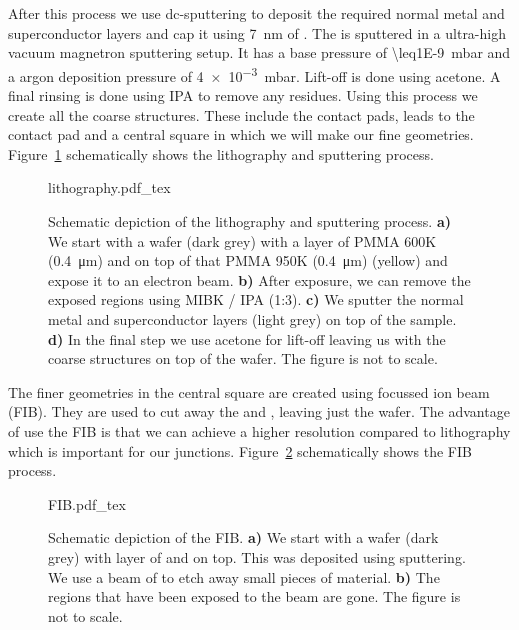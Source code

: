 After this process we use dc-sputtering to deposit the required normal metal and superconductor layers and cap it using \qty{7}{\nano\meter} of . The  is sputtered in a ultra-high vacuum magnetron sputtering setup. It has a base pressure of \qty{\leq1E-9}{\milli\bar} and a argon deposition pressure of \qty{4e-3}{\milli\bar}. Lift-off is done using acetone. A final rinsing is done using IPA to remove any residues. Using this process we create all the coarse structures. These include the contact pads, leads to the contact pad and a central square in which we will make our fine geometries. Figure~\ref{fig:lithography} schematically shows the lithography and sputtering process.

\begin{figure}[ht!]
	\centering
	\def\svgwidth{\textwidth}
	{lithography.pdf_tex}
	\caption{Schematic depiction of the lithography and sputtering process. \textbf{a)} We start with a  wafer (dark grey) with a layer of PMMA 600K (\qty{0.4}{\micro\meter}) and on top of that PMMA 950K (\qty{0.4}{\micro\meter}) (yellow) and expose it to an electron beam. \textbf{b)} After exposure, we can remove the exposed regions using MIBK / IPA (1:3). \textbf{c)} We sputter the normal metal and superconductor layers (light grey) on top of the sample. \textbf{d)} In the final step we use acetone for lift-off leaving us with the coarse structures on top of the wafer. The figure is not to scale.}
	\label{fig:lithography}
\end{figure}

The finer geometries in the central square are created using focussed ion beam (FIB). They are used to cut away the  and , leaving just the wafer. The advantage of use the FIB is that we can achieve a higher resolution compared to lithography which is important for our junctions. Figure~\ref{fig:FIB} schematically shows the FIB process.

\begin{figure}[ht!]
	\centering
	\def\svgwidth{0.5\textwidth}
	{FIB.pdf_tex}
	\caption{Schematic depiction of the FIB. \textbf{a)} We start with a  wafer (dark grey) with layer of  and  on top. This was deposited using sputtering. We use a beam of  to etch away small pieces of material. \textbf{b)} The regions that have been exposed to the  beam are gone. The figure is not to scale.}
	\label{fig:FIB}
\end{figure}
